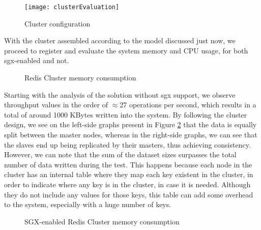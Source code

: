 \begin{figure}[htbp]
	\centering
	{\texttt{[image: clusterEvaluation]}}
	\caption{Cluster configuration}
	\label{fig:clusterLayout}
\end{figure} 
 
With the cluster assembled according to the model discussed just now, we proceed to register and evaluate the system memory and CPU usage, for both \gls{sgx}-enabled and not.

\begin{figure}[htbp]
	\centering
	\caption{Redis Cluster memory consumption}
	\label{fig:noSgxMemoryConsumption_Cluster}
\end{figure}

Starting with the analysis of the solution without \gls{sgx} support, we observe throughput values in the order of $\approx$27 operations per second, which results in a total of around 1000 KBytes written into the system. By following the cluster design, we see on the left-side graphs present in Figure \ref{fig:noSgxMemoryConsumption_Cluster} that the data is equally split between the master nodes, whereas in the right-side graphs, we can see that the slaves end up being replicated by their masters, thus achieving consistency. However, we can note that the sum of the dataset sizes surpasses the total number of data written during the test. This happens because each node in the cluster has an internal table where they map each key existent in the cluster, in order to indicate where any key is in the cluster, in case it is needed. Although they do not include any values for those keys, this table can add some overhead to the system, especially with a huge number of keys.
 
\begin{figure}[htbp]
 	\centering
 	\caption{SGX-enabled Redis Cluster memory consumption}
 	\label{fig:sgxMemoryConsumption_Cluster}
\end{figure}

